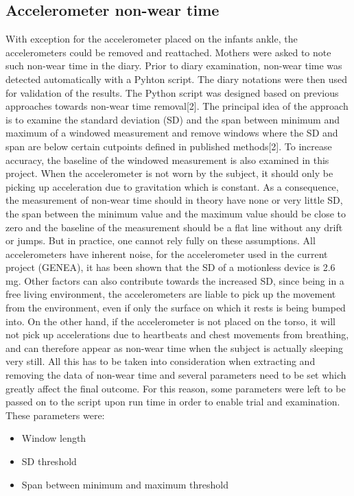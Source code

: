 \documentclass{article}
\begin{document}
{\subsection{Accelerometer non-wear time}
With exception for the accelerometer placed on the infants ankle, the accelerometers could be removed and reattached. Mothers were asked to note such non-wear time in the diary. Prior to diary examination, non-wear time was detected automatically with a Pyhton script. The diary notations were then used for validation of the results. The Python script was designed based on previous approaches towards non-wear time removal[2]. The principal idea of the approach is to examine the standard deviation (SD) and the span between minimum and maximum of a windowed measurement and remove windows where the SD and span are below certain cutpoints defined in published methods[2]. To increase accuracy, the baseline of the windowed measurement is also examined in this project. When the accelerometer is not worn by the subject, it should only be picking up acceleration due to gravitation which is constant. As a consequence, the measurement of non-wear time should in theory have none or very little SD, the span between the minimum value and the maximum value should be close to zero and the baseline of the measurement should be a flat line without any drift or jumps. But in practice, one cannot rely fully on these assumptions. All accelerometers have   inherent noise, for the accelerometer used in the current project (GENEA), it has been shown that the SD of a motionless device is 2.6 mg. Other factors can also contribute towards the increased SD, since being in a free living environment, the accelerometers are liable to pick up the movement from the environment, even if only the surface on which it rests is being bumped into. On the other hand, if the accelerometer is not placed on the torso, it will not pick up accelerations due to heartbeats and chest movements from breathing, and can therefore appear as non-wear time when the subject is actually sleeping very still. All this has to be taken into consideration when extracting and removing the data of non-wear time and several parameters need to be set which greatly affect the final outcome. For this reason, some parameters were left to be passed on to the script upon run time in order to enable trial and examination. These parameters were: 
\begin{itemize}
\item Window length
\item SD threshold
\item Span between minimum and maximum threshold

\end{itemize}}
\end{document}
